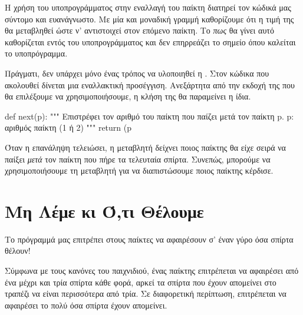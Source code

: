 \documentclass[a4paper,11pt,oneside]{book}
\begin{document}
Η χρήση του υποπρογράμματος στην εναλλαγή του παίκτη διατηρεί τον κώδικά μας σύντομο και ευανάγνωστο. Με μία και μοναδική γραμμή καθορίζουμε ότι η τιμή της  θα μεταβληθεί ώστε ν' αντιστοιχεί στον επόμενο παίκτη. Το \emph{πως} θα γίνει αυτό καθορίζεται εντός του υποπρογράμματος και δεν επηρρεάζει το σημείο όπου καλείται το υποπρόγραμμα.

Πράγματι, δεν υπάρχει μόνο ένας τρόπος να υλοποιηθεί η . Στον κώδικα που ακολουθεί δίνεται μια εναλλακτική προσέγγιση. 
Ανεξάρτητα από την εκδοχή της  που θα επιλέξουμε να χρησιμοποιήσουμε, η κλήση της θα παραμείνει η ίδια. 

\begin{pycode}
def next(p):
    """ Επιστρέφει τον αριθμό του παίκτη
    που παίζει μετά τον παίκτη p.
    p: αριθμός παίκτη (1 ή 2)
    """
    return (p %
\end{pycode}

Όταν η επανάληψη τελειώσει, η μεταβλητή  δείχνει ποιος παίκτης θα είχε σειρά να παίξει \emph{μετά} τον παίκτη που πήρε τα τελευταία σπίρτα. Συνεπώς, μπορούμε να χρησιμοποιήσουμε τη μεταβλητή  για να διαπιστώσουμε ποιος παίκτης κέρδισε.



\section{Μη Λέμε κι Ό,τι Θέλουμε}

\begin{question}
Το πρόγραμμά μας επιτρέπει στους παίκτες να αφαιρέσουν σ' έναν γύρο όσα σπίρτα θέλουν! 
\end{question}

Σύμφωνα με τους κανόνες του παιχνιδιού, ένας παίκτης επιτρέπεται να αφαιρέσει από ένα μέχρι και τρία σπίρτα κάθε φορά, αρκεί τα σπίρτα που έχουν απομείνει στο τραπέζι να είναι περισσότερα από τρία. Σε διαφορετική περίπτωση, επιτρέπεται να αφαιρέσει το πολύ όσα σπίρτα έχουν απομείνει.
\end{document}
